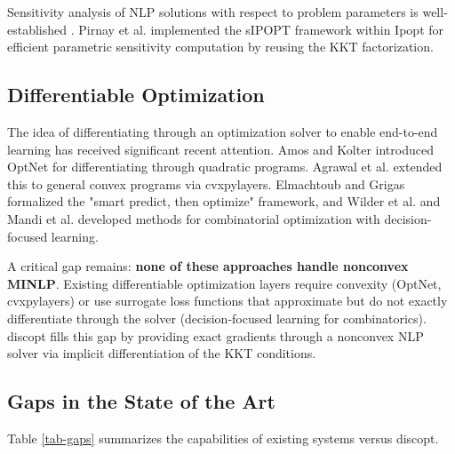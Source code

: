 \documentclass[12pt,preprint]{article}
\begin{document}
Sensitivity analysis of NLP solutions with respect to problem parameters is well-established \cite{Fiacco1983}. Pirnay et al. \cite{Pirnay2012} implemented the sIPOPT framework within Ipopt for efficient parametric sensitivity computation by reusing the KKT factorization.

\subsection{Differentiable Optimization}
\label{org-differentiable-optimization}
The idea of differentiating through an optimization solver to enable end-to-end learning has received significant recent attention. Amos and Kolter \cite{Amos2017} introduced OptNet for differentiating through quadratic programs. Agrawal et al. \cite{Agrawal2019} extended this to general convex programs via cvxpylayers. Elmachtoub and Grigas \cite{Elmachtoub2022} formalized the "smart predict, then optimize" framework, and Wilder et al. \cite{Wilder2019} and Mandi et al. \cite{Mandi2020} developed methods for combinatorial optimization with decision-focused learning.


A critical gap remains: \textbf{none of these approaches handle nonconvex MINLP}. Existing differentiable optimization layers require convexity (OptNet, cvxpylayers) or use surrogate loss functions that approximate but do not exactly differentiate through the solver (decision-focused learning for combinatorics). discopt fills this gap by providing exact gradients through a nonconvex NLP solver via implicit differentiation of the KKT conditions.

\subsection{Gaps in the State of the Art}
\label{org-gaps-in-the-state-of-the-art}
Table \ref{tab-gaps} summarizes the capabilities of existing systems versus discopt.
\end{document}
